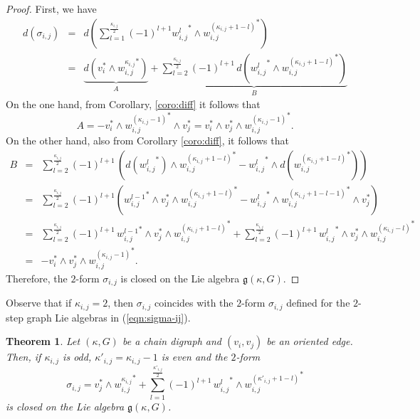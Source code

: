 \documentclass[a4paper,11pt]{amsart}
\newtheorem{theorem}{Theorem}[section]
\theoremstyle{definition}
\theoremstyle{remark}
\numberwithin{equation}{section}
\newcommand{\g}{\mathfrak{g}}
\begin{document}
\begin{proof} 
First, we have 
\begin{eqnarray*}
    	 d(\sigma_{i,j}) &=& d\left(\sum_{l=1}^{\frac{\kappa_{i,j}}2} (-1)^{l+1} {w_{i,j}^{l}}^* \wedge {w_{i,j}^{(\kappa_{i,j}+1-l)}}^*\right) \\ 
    	                &=& \underbrace{ d\left(v_i^* \wedge {w_{i,j}^{\kappa_{i,j}}}^*\right)}_A + 
    	                 \underbrace{\sum_{l=2}^{\frac{\kappa_{i,j}}2} (-1)^{l+1} \, d\left({w_{i,j}^{l}}^* \wedge {w_{i,j}^{(\kappa_{i,j}+1-l)}}^*\right)}_{B}
\end{eqnarray*}
On the one hand, from Corollary, \ref{coro:diff} it follows that
\[ 
A = -v_i^* \wedge {w_{i,j}^{(\kappa_{i,j}-1)}}^*\wedge  v_j^* = v_i^* \wedge v_j^* \wedge {w_{i,j}^{(\kappa_{i,j}-1)}}^*.
\]
On the other hand, also from Corollary \ref{coro:diff}, it follows that
\begin{eqnarray*}
                         B&=&\sum_{l=2}^{\frac{\kappa_{i,j}}2} (-1)^{l+1} \, \left( d\left({w_{i,j}^{l}}^*\right) \wedge {w_{i,j}^{(\kappa_{i,j}+1-l)}}^*- {w_{i,j}^{l}}^* \wedge d\left({w_{i,j}^{(\kappa_{i,j}+1-l)}}^*\right)\right)\\
                         &=& \sum_{l=2}^{\frac{\kappa_{i,j}}2} (-1)^{l+1} \left(  {w_{i,j}^{l-1}}^* \wedge  v_j^*\wedge {w_{i,j}^{(\kappa_{i,j}+1-l)}}^*- {w_{i,j}^{l}}^* \wedge {w_{i,j}^{(\kappa_{i,j}+1-l-1)}}^*\wedge  v_j^*\right)\\
                            &=& \sum_{l=2}^{\frac{\kappa_{i,j}}2} (-1)^{l+1}\,  {w_{i,j}^{l-1}}^* \wedge  v_j^*\wedge {w_{i,j}^{(\kappa_{i,j}+1-l)}}^*+ \sum_{l=2}^{\frac{\kappa_{i,j}}2} (-1)^{l+1}\, {w_{i,j}^{l}}^* \wedge  v_j^* \wedge  {w_{i,j}^{(\kappa_{i,j}-l)}}^* \\
                         &=& - v_i^* \wedge v_j^* \wedge {w_{i,j}^{(\kappa_{i,j}-1)}}^*.
\end{eqnarray*}  
Therefore, the \(2\)-form \(\sigma_{i,j}\) is closed on the Lie algebra \(\g(\kappa,G)\).
    \end{proof}

Observe that if \(\kappa_{i,j}=2\), then \(\sigma_{i,j}\) coincides with the \(2\)-form \(\sigma_{i,j}\) defined for the \(2\)-step graph Lie algebras in (\ref{eqn:sigma-ij}).  
   
\begin{theorem}\label{thm:odd}
	Let \((\kappa,G)\) be a chain digraph and $(v_i,v_j)$ be an oriented edge.
    Then, if $\kappa_{i,j}$ is odd, $\kappa'_{i,j}=\kappa_{i,j}-1$ is even and the \(2\)-form
    \begin{equation}\label{eqn:sigma-odd}
    	\sigma_{i,j} = v_j^* \wedge {w_{i,j}^{\kappa_{i,j}}}^* + \sum_{l=1}^{\frac{\kappa'_{i,j}}2} (-1)^{l+1}\,{w_{i,j}^{l}}^* \wedge {w_{i,j}^{(\kappa'_{i,j}+1-l)}}^*
    \end{equation}                  
    is closed on the Lie algebra \(\g(\kappa,G)\).
\end{theorem}
\end{document}
